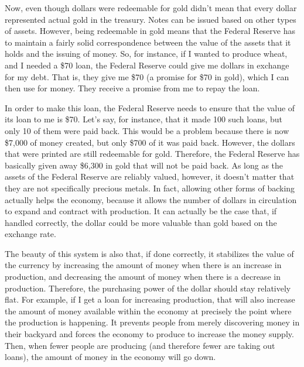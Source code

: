 \documentclass[letterpaper]{article}
\begin{document}
{\color{black}
Now, even though dollars were redeemable for gold didn’t mean that every
dollar represented actual gold in the treasury. Notes can be issued
based on other types of assets. However, being redeemable in gold means
that the Federal Reserve has to maintain a fairly solid correspondence
between the value of the assets that it holds and the issuing of money.
So, for instance, if I wanted to produce wheat, and I needed a \$70
loan, the Federal Reserve could give me dollars in exchange for my
debt. That is, they give me \$70 (a promise for \$70 in gold), which I
can then use for money. They receive a promise from me to repay the
loan. }

{\color{black}
In order to make this loan, the Federal Reserve needs to ensure that the
value of its loan to me is \$70. Let’s say, for instance, that it made
100 such loans, but only 10 of them were paid back. This would be a
problem because there is now \$7,000 of money created, but only \$700
of it was paid back. However, the dollars that were printed are still
redeemable for gold. Therefore, the Federal Reserve has basically given
away \$6,300 in gold that will not be paid back. As long as the assets
of the Federal Reserve are reliably valued, however, it doesn’t matter
that they are not specifically precious metals. In fact, allowing other
forms of backing actually helps the economy, because it allows the
number of dollars in circulation to expand and contract with
production. It can actually be the case that, if handled correctly, the
dollar could be more valuable than gold based on the exchange rate.}

{\color{black}
The beauty of this system is also that, if done correctly, it stabilizes
the value of the currency by increasing the amount of money when there
is an increase in production, and decreasing the amount of money when
there is a decrease in production. Therefore, the purchasing power of
the dollar should stay relatively flat.
\textcolor[rgb]{0.32941177,0.5529412,0.83137256}{For example, i}f I get
a loan for increasing production, that will also increase the amount of
money available within the economy at precisely the point where the
production is happening. It prevents people from merely discovering
money in their backyard and forces the economy to produce to increase
the money supply. Then, when fewer people are producing (and therefore
fewer are taking out loans), the amount of money in the economy will go
down.}
\end{document}
